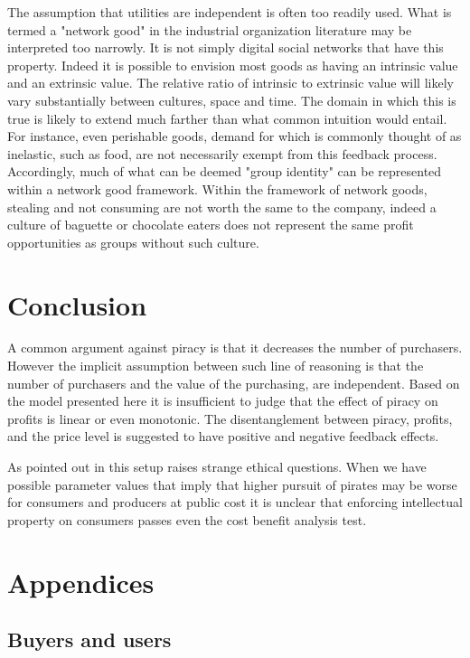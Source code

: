 \documentclass{article}
\begin{document}
The assumption that utilities are independent is often too readily used. What is termed a "network good" in the industrial organization literature may be interpreted too narrowly. It is not simply digital social networks that have this property. Indeed it is possible to envision most goods as having an intrinsic value and an extrinsic value. The relative ratio of intrinsic to extrinsic value will likely vary substantially between cultures, space and time. The domain in which this is true is likely to extend much farther than what common intuition would entail. For instance, even perishable goods, demand for which is commonly thought of as inelastic, such as food, are not necessarily exempt from this feedback process. Accordingly, much of what can be deemed "group identity" can be represented within a network good framework. Within the framework of network goods, stealing and not consuming are not worth the same to the company, indeed a culture of baguette or chocolate eaters does not represent the same profit opportunities as groups without such culture.  

\section{Conclusion}

A common argument against piracy is that it decreases the number of purchasers. However the implicit assumption between such line of reasoning is that the number of purchasers and the value of the purchasing, are independent. Based on the model presented here it is insufficient to judge that the effect of piracy on profits is linear or even monotonic. The disentanglement between piracy, profits, and the price level is suggested to have positive and negative feedback effects. 

As pointed out in \cite{CRP91} this setup raises strange ethical questions. When we have possible parameter values that imply that higher pursuit of pirates may be worse for consumers and producers at public cost it is unclear that enforcing intellectual property on consumers passes even the cost benefit analysis test. 




\section{Appendices}

\subsection{Buyers and users}
\end{document}
